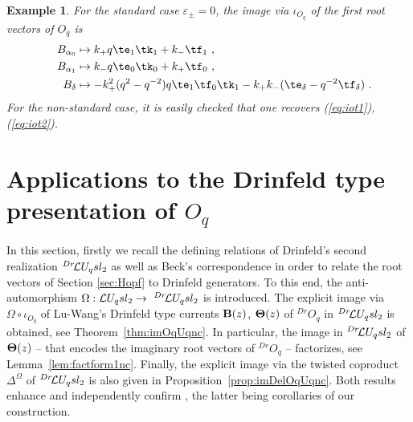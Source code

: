 \documentclass[11pt]{amsart}
\numberwithin{equation}{section}
\newtheorem{example}[thm]{Example}
\numberwithin{equation}{section}
\begin{document}
\begin{example} For the standard case $\varepsilon_\pm=0$, the image via $\iota_{O_q}$ of the first root vectors of $O_q$ is
	\begin{align*}
	&& B_{\alpha_0} &\mapsto k_+ q \te_1\tk_1 + k_-\tf_1\ ,\\
	&&  	B_{\alpha_1} &\mapsto k_- q \te_0\tk_0 + k_+\tf_0\ ,\\
	&&	B_{\delta} &\mapsto -k_+^2(q^2-q^{-2})q\te_1\tf_0\tk_1 - k_+k_-(\te_\delta - q^{-2}\tf_\delta) \ .
	\end{align*}
For the non-standard case, it is easily checked that one recovers (\ref{eq:iot1}), (\ref{eq:iot2}). \end{example}

\section{Applications to the Drinfeld type presentation of $O_q$}\label{sec:DrOq}
In this section, firstly we recall the defining relations of  Drinfeld's second realization ${}^{Dr}\!\mathcal{L} U_q sl_2$ as well as Beck's correspondence \cite{Beck,BCP} in order to relate the root vectors of Section \ref{sec:Hopf} to Drinfeld generators. To this end, the anti-automorphism $\Omega:\mathcal{L} U_q sl_2 \rightarrow \ {}^{Dr}\!\mathcal{L} U_q sl_2$ is introduced. The explicit image via $\Omega\circ \iota_{O_q}$ of Lu-Wang's Drinfeld type currents ${\bf B}(z)$, ${\bf \Theta}(z)$ of $^{Dr}O_q$ in ${}^{Dr}\!\mathcal{L} U_q sl_2$ is obtained, see Theorem~\ref{thm:imOqUqnc}. In particular, the image in  ${}^{Dr}\!\mathcal{L} U_q sl_2$ of ${\bf \Theta}(z)$ -- that encodes the imaginary root vectors of $^{Dr}O_q$ -- factorizes, see Lemma~\ref{lem:factform1nc}. Finally, the explicit image via the twisted coproduct $\Delta^{\Omega}$ of ${}^{Dr}\!\mathcal{L} U_q sl_2$ is also given in Proposition~\ref{prop:imDelOqUqnc}. Both results enhance and independently confirm  \cite[Thm.\,1.1,Thm.\,1.2]{P24}, the latter being corollaries of our construction.
\end{document}
